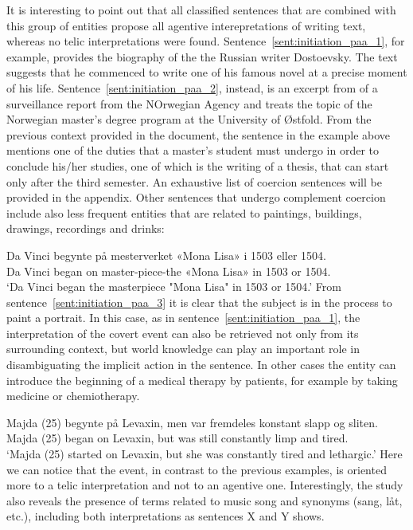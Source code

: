 \documentclass{article}
\begin{document}
It is interesting to point out that all classified sentences that are combined with this group of entities propose all agentive interepretations of writing text, whereas no telic interpretations were found. Sentence~\ref{sent:initiation_paa_1}, for example, provides the biography of the the Russian writer Dostoevsky. The text suggests that he commenced to write one of his famous novel at a precise moment of his life. Sentence~\ref{sent:initiation_paa_2}, instead, is an excerpt from of a surveillance report from the NOrwegian Agency and treats the topic of the Norwegian master's degree program at the University of Østfold. From the previous context provided in the document, the sentence in the example above mentions one of the duties that a master's student must undergo in order to conclude his/her studies, one of which is the writing of a thesis, that can start only after the third semester. An exhaustive list of coercion sentences will be provided in the appendix. %
Other sentences that undergo complement coercion include also less frequent entities that are related to paintings, buildings, drawings, recordings and drinks:

    \ea \label{sent:initiation_paa_3} %

    \gll Da Vinci begynte på mesterverket «Mona Lisa» i 1503 eller 1504.\\
         Da Vinci began on master-piece-the «Mona Lisa» in 1503 or 1504.\\
    \glt ‘Da Vinci began the masterpiece "Mona Lisa" in 1503 or 1504.’
    \z
From sentence~\ref{sent:initiation_paa_3} it is clear that the subject is in the process to paint a portrait. In this case, as in sentence~\ref{sent:initiation_paa_1}, the interpretation of the covert event can also be retrieved not only from its surrounding context, but world knowledge can play an important role in disambiguating the implicit action in the sentence. 
In other cases the entity can introduce the beginning of a medical therapy by patients, for example by taking medicine or chemiotherapy.   
    \ea \label{sent:initiation_paa_4} %

    \gll Majda (25) begynte på Levaxin, men var fremdeles konstant slapp og sliten.\\
         Majda (25) began on Levaxin, but was still constantly limp and tired.\\
    \glt ‘Majda (25) started on Levaxin, but she was constantly tired and lethargic.’
    \z
Here we can notice that the event, in contrast to the previous examples, is oriented more to a telic interpretation and not to an agentive one.
Interestingly, the study also reveals the presence of terms related to music song and synonyms (sang, låt, etc.), including both interpretations as sentences X and Y shows.
    \ea \label{sent:initiation_paa_4} %
\end{document}

